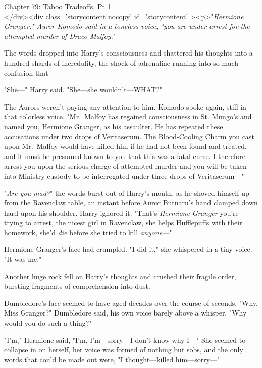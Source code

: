 
Chapter 79: Taboo Tradeoffs, Pt 1\\
</div><div  class='storycontent nocopy' id='storycontent' ><p>"\emph{Hermione 
Granger," Auror Komodo said in a toneless voice, "you are under arrest for the 
attempted murder of Draco Malfoy.}"

The words dropped into Harry's consciousness and shattered his thoughts into a 
hundred shards of incredulity, the shock of adrenaline running into so much 
confusion that---

"She---" Harry said. "She---she wouldn't---WHAT?"

The Aurors weren't paying any attention to him. Komodo spoke again, still in 
that colorless voice. "Mr.~Malfoy has regained consciousness in St. Mungo's and 
named you, Hermione Granger, as his assaulter. He has repeated these 
accusations under two drops of Veritaserum. The Blood-Cooling Charm you cast 
upon Mr.~Malfoy would have killed him if he had not been found and treated, and 
it must be presumed known to you that this was a fatal curse. I therefore 
arrest you upon the serious charge of attempted murder and you will be taken 
into Ministry custody to be interrogated under three drops of Veritaserum---"

"\emph{Are you mad?}" the words burst out of Harry's mouth, as he shoved 
himself up from the Ravenclaw table, an instant before Auror Butnaru's hand 
clamped down hard upon his shoulder. Harry ignored it. "That's \emph{Hermione 
Granger} you're trying to arrest, the nicest girl in Ravenclaw, she helps 
Hufflepuffs with their homework, she'd \emph{die} before she tried to kill 
\emph{anyone---}"

Hermione Granger's face had crumpled. "I did it," she whispered in a tiny 
voice. "It was me."

Another huge rock fell on Harry's thoughts and crushed their fragile order, 
bursting fragments of comprehension into dust.

Dumbledore's face seemed to have aged decades over the course of seconds. "Why, 
Miss Granger?" Dumbledore said, his own voice barely above a whisper. "Why 
would you do such a thing?"

"I'm," Hermione said, "I'm, I'm---sorry---I don't know why I---" She seemed to 
collapse in on herself, her voice was formed of nothing but sobs, and the only 
words that could be made out were, "I thought---killed him---sorry---"


